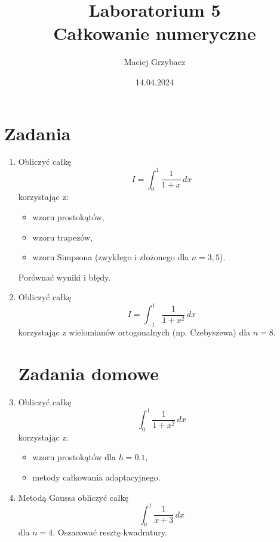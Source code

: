 \documentclass[10pt]{article}
\title{Laboratorium 5 \\ Całkowanie numeryczne}
\author{Maciej Grzybacz}
\date{14.04.2024}
\begin{document}
\maketitle

\section*{Zadania}

\begin{enumerate}
    \item Obliczyć całkę 
    \[
    I = \int_0^1 \frac{1}{1+x} \, dx
    \]
    korzystając z:
    \begin{itemize}
        \item wzoru prostokątów,
        \item wzoru trapezów,
        \item wzoru Simpsona (zwykłego i złożonego dla \( n=3, 5 \)).
    \end{itemize}
    Porównać wyniki i błędy.

    \item Obliczyć całkę 
    \[
    I = \int_{-1}^1 \frac{1}{1+x^2} \, dx
    \]
    korzystając z wielomianów ortogonalnych (np. Czebyszewa) dla \( n=8 \).

    \section*{Zadania domowe}

    \item Obliczyć całkę 
    \[
    \int_0^1 \frac{1}{1+x^2} \, dx
    \]
    korzystając z:
    \begin{itemize}
        \item wzoru prostokątów dla \( h=0.1 \),
        \item metody całkowania adaptacyjnego.
    \end{itemize}

    \item Metodą Gaussa obliczyć całkę 
    \[
    \int_0^1 \frac{1}{x+3} \, dx
    \]
    dla \( n=4 \). Oszacować resztę kwadratury.
\end{enumerate}
\end{document}
